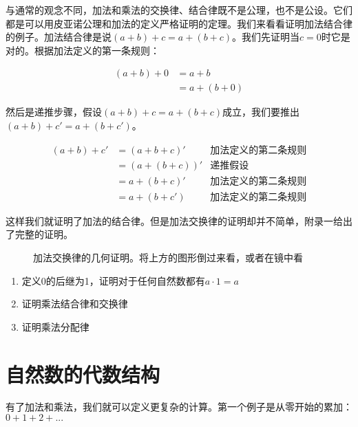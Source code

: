 \documentclass[UTF8]{article}
\begin{document}
与通常的观念不同，加法和乘法的交换律、结合律既不是公理，也不是公设。它们都是可以用皮亚诺公理和加法的定义严格证明的定理。我们来看看证明加法结合律的例子。加法结合律是说$(a + b) + c= a + (b + c)$。我们先证明当$c=0$时它是对的。根据加法定义的第一条规则：

\[
\begin{array}{rl}
(a + b) + 0 & = a + b \\
            & = a + (b + 0)
\end{array}
\]

然后是递推步骤，假设$(a + b) + c = a + (b + c)$成立，我们要推出$(a + b) + c' = a + (b + c')$。

\[
\begin{array}{rlr}
(a + b) + c' & = (a + b + c)' & \text{加法定义的第二条规则} \\
             & = (a + (b + c))' & \text{递推假设} \\
             & = a + (b + c)' & \text{加法定义的第二条规则} \\
             & = a + (b + c') & \text{加法定义的第二条规则}
\end{array}
\]

这样我们就证明了加法的结合律。但是加法交换律的证明却并不简单，附录一给出了完整的证明。

\begin{figure}[htbp]
\centering
{}
\caption{加法交换律的几何证明。将上方的图形倒过来看，或者在镜中看}
\end{figure}

\begin{Exercise}
\begin{enumerate}
\item 定义0的后继为1，证明对于任何自然数都有$a \cdot 1 = a$
\item 证明乘法结合律和交换律
\item 证明乘法分配律
\end{enumerate}
\end{Exercise}

\section{自然数的代数结构}
有了加法和乘法，我们就可以定义更复杂的计算。第一个例子是从零开始的累加：$0 + 1 + 2 + ... $
\end{document}
